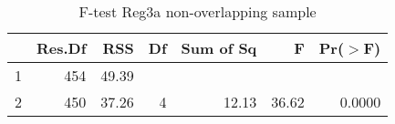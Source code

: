 \begin{table}[htbp!]
\centering
\caption{F-test Reg3a non-overlapping sample} 
\begin{tabular}{lrrrrrr}
  \hline
 & Res.Df & RSS & Df & Sum of Sq & F & Pr($>$F) \\ 
  \hline
1 & 454 & 49.39 &  &  &  &  \\ 
  2 & 450 & 37.26 & 4 & 12.13 & 36.62 & 0.0000 \\ 
   \hline
\end{tabular}
\end{table}
